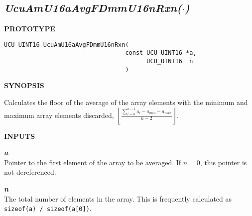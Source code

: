 \subsection[\emph{UcuAmU16aAvgFDmmU16nRxn(\protect\mbox{\protect$\cdot$})}]
           {\emph{UcuAmU16aAvgFDmmU16nRxn(\protect\mbox{\protect\boldmath $\cdot$})}}
\label{cami0:safn0:savg1}

%

\noindent\textbf{PROTOTYPE}
\begin {list}{}{\setlength{\leftmargin}{0.25in}\setlength{\topsep}{0.0in}}
\item
\begin{verbatim}
UCU_UINT16 UcuAmU16aAvgFDmmU16nRxn(
                                  const UCU_UINT16 *a,
                                        UCU_UINT16  n
                                  )
\end{verbatim}
\end{list}
\vspace{2.8ex}

\noindent\textbf{SYNOPSIS}
\begin{list}{}{\setlength{\leftmargin}{0.25in}\setlength{\topsep}{0.0in}}
\item Calculates the floor of the average of the array elements with the 
      minimum and maximum array elements discarded,
      $\displaystyle{\left\lfloor{\frac{\sum_{i=0}^{n-1}a_i - a_{min} - a_{max}}{n-2}}\right\rfloor}$.
\end{list}
\vspace{2.8ex}

\noindent\textbf{INPUTS}
\begin{list}{}{\setlength{\leftmargin}{0.5in}\setlength{\itemindent}{-0.25in}\setlength{\topsep}{0.0in}\setlength{\partopsep}{0.0in}}
\item \emph{\textbf{a}}\\
      Pointer to the first element of the array to be averaged.  If $n=0$, this
      pointer is not dereferenced.
\item \emph{\textbf{n}}\\
      The total number of elements in the array.  This is frequently
      calculated as \texttt{sizeof(a) / sizeof(a[0])}.
\end{list}
\vspace{2.8ex}

